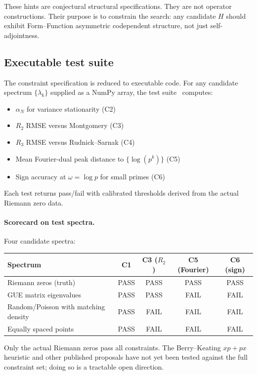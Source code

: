 \documentclass[11pt,a4paper]{article}
\theoremstyle{plain}
\theoremstyle{definition}
\theoremstyle{remark}
\begin{document}
These hints are conjectural structural specifications. They are not
operator constructions. Their purpose is to constrain the search:
any candidate $H$ should exhibit Form--Function asymmetric
codependent structure, not just self-adjointness.

\subsection{Executable test suite}
\label{sec:hp-tests}

The constraint specification is reduced to executable code. For any
candidate spectrum $\{\lambda_k\}$ supplied as a NumPy array, the
test suite~\cite{HPCode} computes:
\begin{itemize}
\item $\alpha_N$ for variance stationarity (C2)
\item $R_2$ RMSE versus Montgomery (C3)
\item $R_3$ RMSE versus Rudnick--Sarnak (C4)
\item Mean Fourier-dual peak distance to $\{\log(p^k)\}$ (C5)
\item Sign accuracy at $\omega = \log p$ for small primes (C6)
\end{itemize}
Each test returns pass/fail with calibrated thresholds derived from
the actual Riemann zero data.

\paragraph{Scorecard on test spectra.} Four candidate spectra:

\begin{center}
\begin{tabular}{lcccc}
\toprule
Spectrum & C1 & C3 ($R_2$) & C5 (Fourier) & C6 (sign) \\
\midrule
Riemann zeros (truth) & PASS & PASS & PASS & PASS \\
GUE matrix eigenvalues & PASS & PASS & FAIL & FAIL \\
Random/Poisson with matching density & PASS & FAIL & FAIL & FAIL \\
Equally spaced points & PASS & FAIL & FAIL & FAIL \\
\bottomrule
\end{tabular}
\end{center}

Only the actual Riemann zeros pass all constraints. The Berry--Keating
$xp+px$ heuristic and other published proposals have not yet been
tested against the full constraint set; doing so is a tractable open
direction.
\end{document}
